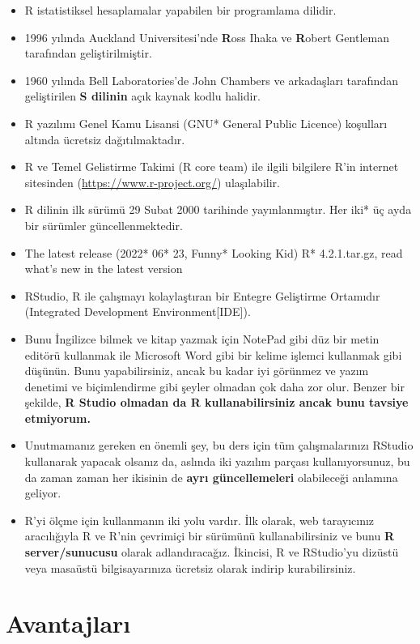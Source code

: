 \documentclass[
  oneside]{book}
\begin{document}
\begin{itemize}
\item
  R istatistiksel hesaplamalar yapabilen bir programlama dilidir.
\item
  1996 yılında Auckland Universitesi'nde \textbf{R}oss Ihaka ve \textbf{R}obert Gentleman tarafından geliştirilmiştir.
\item
  1960 yılında Bell Laboratories'de John Chambers ve arkadaşları tarafından geliştirilen \textbf{S dilinin} açık kaynak kodlu halidir.
\item
  R yazılımı Genel Kamu Lisansi (GNU* General Public Licence) koşulları altında ücretsiz dağıtılmaktadır.
\item
  R ve Temel Gelistirme Takimi (R core team) ile ilgili bilgilere R'in internet sitesinden (\url{https://www.r-project.org/}) ulaşılabilir.
\item
  R dilinin ilk sürümü 29 Subat 2000 tarihinde yayınlanmıştır. Her iki* üç ayda bir sürümler güncellenmektedir.
\item
  The latest release (2022* 06* 23, Funny* Looking Kid) R* 4.2.1.tar.gz, read what's new in the latest version
\item
  RStudio, R ile çalışmayı kolaylaştıran bir Entegre Geliştirme Ortamıdır (Integrated Development Environment{[}IDE{]}).
\item
  Bunu İngilizce bilmek ve kitap yazmak için NotePad gibi düz bir metin editörü kullanmak ile Microsoft Word gibi bir kelime işlemci kullanmak gibi düşünün. Bunu yapabilirsiniz, ancak bu kadar iyi görünmez ve yazım denetimi ve biçimlendirme gibi şeyler olmadan çok daha zor olur. Benzer bir şekilde, \textbf{R Studio olmadan da R kullanabilirsiniz ancak bunu tavsiye etmiyorum.}
\item
  Unutmamanız gereken en önemli şey, bu ders için tüm çalışmalarınızı RStudio kullanarak yapacak olsanız da, aslında iki yazılım parçası kullanıyorsunuz, bu da zaman zaman her ikisinin de \textbf{ayrı güncellemeleri} olabileceği anlamına geliyor.
\item
  R'yi ölçme için kullanmanın iki yolu vardır. İlk olarak, web tarayıcınız aracılığıyla R ve R'nin çevrimiçi bir sürümünü kullanabilirsiniz ve bunu \textbf{R server/sunucusu} olarak adlandıracağız. İkincisi, R ve RStudio'yu dizüstü veya masaüstü bilgisayarınıza ücretsiz olarak indirip kurabilirsiniz.
\end{itemize}

\hypertarget{avantajlarux131}{%
\section{Avantajları}\label{avantajlarux131}}
\end{document}
